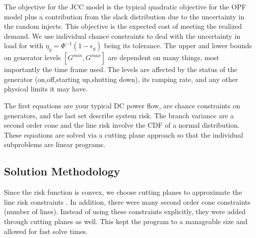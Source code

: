 The objective  for the JCC model is the typical quadratic objective for the OPF model plus a contribution from the slack distribution due to the uncertainty in the random injects.  This objective is the expected cost of meeting the realized demand.  We use individual chance constraints to deal with the uncertainty in load for  with $\eta_g = \Phi^{-1}(1-\epsilon_g)$ being its tolerance.  The upper and lower bounds on generator levels $[G^{min},G^{max}]$ are dependent on many things, most importantly the time frame used.  The levels are affected by the status of the generator (on,off,starting up,shutting down),  its ramping rate, and any other physical limits it may have.  

The first equations  are your typical DC power flow,  are chance constraints on generators, and the last set  describe system risk.  The branch variance  are a second order cone and the line risk  involve the CDF of a normal distribution.  These equations are solved via a cutting plane approach so that the individual subproblems are linear programs.


\subsection{Solution Methodology}\label{solutionmethodology}
Since the risk function is convex, we choose cutting planes to approximate the line risk constraints .  In addition, there were many second order cone constraints (number of lines).  Instead of using these constraints explicitly, they were added through cutting planes as well.  This kept the program to a manageable size and allowed for fast solve times.  

